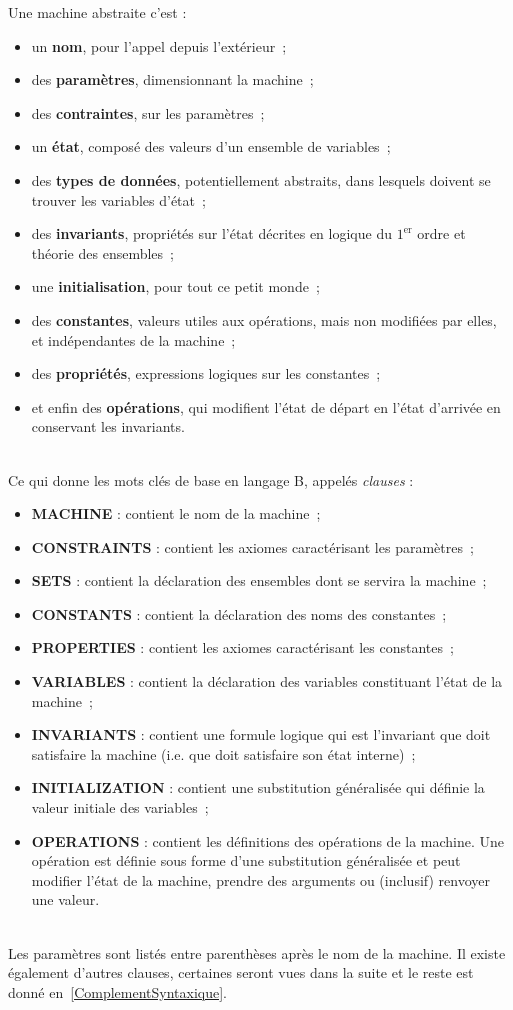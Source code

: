 \documentclass[10pt,a4paper]{article}
\begin{document}
Une machine abstraite c'est :
\begin{itemize}
\item un \textbf{nom}, pour l'appel depuis l'extérieur~;
\item des \textbf{paramètres}, dimensionnant la machine~;
\item des \textbf{contraintes}, sur les paramètres~;
\item un \textbf{état}, composé des valeurs d'un ensemble de variables~;
\item des \textbf{types de données}, potentiellement abstraits, dans lesquels doivent se trouver les variables d'état~;
\item des \textbf{invariants}, propriétés sur l'état décrites en logique du $1^{\text{er}}$ ordre et théorie des ensembles~;
\item une \textbf{initialisation}, pour tout ce petit monde~;
\item des \textbf{constantes}, valeurs utiles aux opérations, mais non modifiées par elles, et indépendantes de la machine~;
\item des \textbf{propriétés}, expressions logiques sur les constantes~;
\item et enfin des \textbf{opérations}, qui modifient l'état de départ en l'état d'arrivée en conservant les invariants.
\end{itemize}
\ \\
Ce qui donne les mots clés de base en langage B, appelés \emph{clauses} :
\begin{itemize}
\item \textbf{MACHINE} : contient le nom de la machine~;
\item \textbf{CONSTRAINTS} : contient les axiomes caractérisant les paramètres~;
\item \textbf{SETS} : contient la déclaration des ensembles dont se servira la machine~;
\item \textbf{CONSTANTS} : contient la déclaration des noms des constantes~;
\item \textbf{PROPERTIES} : contient les axiomes caractérisant les constantes~;
\item \textbf{VARIABLES} : contient la déclaration des variables constituant l'état de la machine~;
\item \textbf{INVARIANTS} : contient une formule logique qui est l'invariant que doit satisfaire la machine (i.e. que doit satisfaire son état interne)~;
\item \textbf{INITIALIZATION} : contient une substitution généralisée qui définie la valeur initiale des variables~;
\item \textbf{OPERATIONS} : contient les définitions des opérations de la machine. Une opération est définie sous forme d'une substitution généralisée et peut modifier l'état de la machine, prendre des arguments ou (inclusif) renvoyer une valeur.
\end{itemize}
\ \\
Les paramètres sont listés entre parenthèses après le nom de la machine. Il existe également d'autres clauses, certaines seront vues dans la suite et le reste est donné en~\cref{ComplementSyntaxique}.
\end{document}
